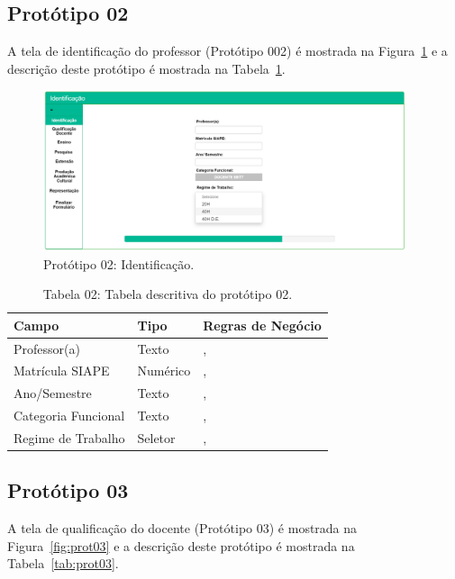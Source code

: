 \newpage
\subsection{Protótipo 02}\label{prototipo02}
A tela de identificação do professor (Protótipo 002) é mostrada na Figura~\ref{fig:prot02} e a descrição deste protótipo é mostrada na Tabela~\ref{tab:prot02}.


\begin{figure}[H]
    \centering
    \includegraphics[width=0.95\textwidth]{img/2pagina_de_identificacao.png}
    \caption[Protótipo 02: Identificação]{Protótipo 02: Identificação.}
    \label{fig:prot02}
\end{figure}


\begin{table}[H]
\centering
\caption[Tabela 02: Tabela descritiva do protótipo 02.]{Tabela 02: Tabela descritiva do protótipo 02.}
\label{tab:prot02}
\begin{tabular}{@{}lll@{}}
\toprule
Campo               & Tipo     &  Regras de Negócio                     \\ \midrule
Professor(a)        & Texto    &    \nameref{rn002}, \nameref{rn004}    \\
Matrícula SIAPE     & Numérico &    \nameref{rn002}, \nameref{rn004}    \\
Ano/Semestre        & Texto    &    \nameref{rn002}, \nameref{rn004}    \\
Categoria Funcional & Texto    &    \nameref{rn003}, \nameref{rn004}    \\
Regime de Trabalho  & Seletor  &    \nameref{rn002}, \nameref{rn004}    \\ \bottomrule
\end{tabular}
\end{table}


\newpage
\subsection{Protótipo 03}\label{prototipo03}
A tela de qualificação do docente (Protótipo 03) é mostrada na Figura~\ref{fig:prot03} e a descrição deste protótipo é mostrada na Tabela~\ref{tab:prot03}.


